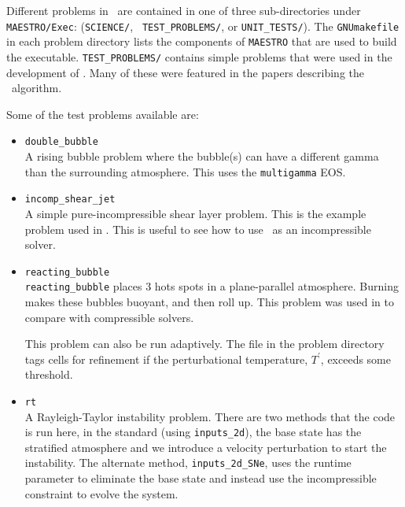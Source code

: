 Different problems in \maestro\ are contained in one of three
sub-directories under {\tt MAESTRO/Exec}: ({\tt SCIENCE/}, {\tt
TEST\_PROBLEMS/}, or {\tt UNIT\_TESTS/}).  The {\tt GNUmakefile} in each
problem directory lists the components of {\tt MAESTRO} that are used
to build the executable.  {\tt TEST\_PROBLEMS/} contains simple
problems that were used in the development of \maestro.  Many
of these were featured in the papers describing the \maestro\ algorithm.

Some of the test problems available are:
\begin{itemize}
\item {\tt double\_bubble} \\[-3mm]

A rising bubble problem where the bubble(s) can have a different gamma
than the surrounding atmosphere.  This uses the {\tt multigamma} EOS.

\item {\tt incomp\_shear\_jet} \\[-3mm]

A simple pure-incompressible shear layer problem.  This is the example
problem used in \cite{bellcolellaglaz}.  This is useful to see how to
use \maestro\ as an incompressible solver.

\item {\tt reacting\_bubble} \\[-3mm]

{\tt reacting\_bubble} places 3 hots spots in a plane-parallel atmosphere.
Burning makes these bubbles buoyant, and then roll up.  This problem was
used in \cite{lowMach3} to compare with compressible solvers.

This problem can also be run adaptively.  The 
file in the problem directory tags cells for refinement if the
perturbational temperature, $T^\prime$, exceeds some threshold.  

\item {\tt rt} \\ [-3mm]

A Rayleigh-Taylor instability problem.  There are two methods that the
code is run here, in the standard (using {\tt inputs\_2d}), the base state
has the stratified atmosphere and we introduce a velocity perturbation
to start the instability.  The alternate method, {\tt inputs\_2d\_SNe}, uses
the  runtime parameter to eliminate the base state
and instead use the incompressible constraint to evolve the system.


\end{itemize}
